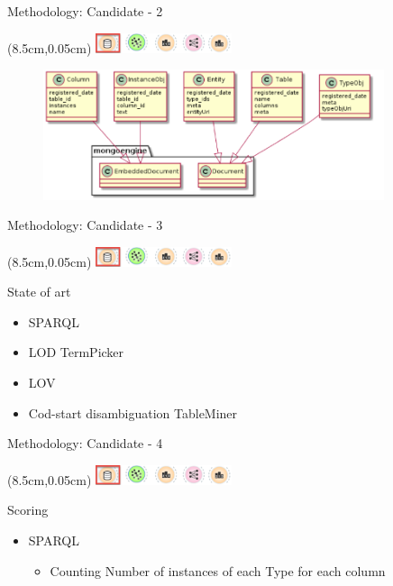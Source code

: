 \documentclass{beamer}
\begin{document}
\begin{frame}{Methodology: Candidate - 2}
	\begin{textblock*}{4cm}(8.5cm,0.05cm) %
		\includegraphics[width=4cm]{images/header-candidate.png}
	\end{textblock*}
	\begin{figure}
		\includegraphics[width=10cm]{images/relational-model-types.png}
	\end{figure}
\end{frame}
\begin{frame}{Methodology: Candidate - 3}
	\begin{textblock*}{4cm}(8.5cm,0.05cm) %
		\includegraphics[width=4cm]{images/header-candidate.png}
	\end{textblock*}
	State of art
	\begin{itemize}
		\item SPARQL
		\item LOD TermPicker
		\item LOV
		\item Cod-start disambiguation TableMiner
	\end{itemize}
\end{frame}
\begin{frame}{Methodology: Candidate - 4}
	\begin{textblock*}{4cm}(8.5cm,0.05cm) %
		\includegraphics[width=4cm]{images/header-candidate.png}
	\end{textblock*}
	Scoring
	\begin{itemize}
		\item SPARQL
		\begin{itemize}
			\item Counting Number of instances of each Type for each column
		\end{itemize}
	\end{itemize}
\end{frame}
\end{document}
